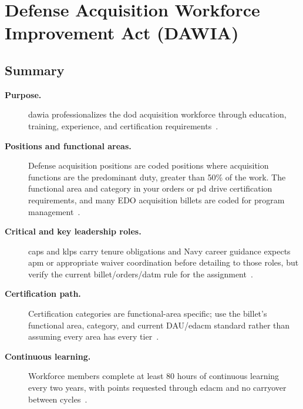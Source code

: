 \documentclass[../main.tex]{subfiles}
\begin{document}
\section{Defense Acquisition Workforce Improvement Act (DAWIA)}

\subsection{Summary}
\begin{description}
  \item[\textbf{Purpose.}] \ac{dawia} professionalizes the \ac{dod} acquisition workforce through education, training, experience, and certification requirements~\autocite{edo-5-2-1-dawia-2025,DoDI-5000-66-DAWIA-2022}.
  \item[\textbf{Positions and functional areas.}] Defense acquisition positions are coded positions where
  acquisition functions are the predominant duty, greater than 50\% of the work. The functional area and
  category in your orders or \ac{pd} drive certification requirements, and many EDO acquisition billets are
  coded for program management~\autocite{edo-5-2-1-dawia-2025,DoDI-5000-66-DAWIA-2022}.
  \item[\textbf{Critical and key leadership roles.}] \acp{cap} and \acp{klp} carry tenure obligations and
  Navy career guidance expects \ac{apm} or appropriate waiver coordination before detailing to those roles, but verify the current billet/orders/\ac{datm} rule for the assignment~\autocite{edo-5-2-1-dawia-2025,DoDI-5000-66-DAWIA-2022}.
  \item[\textbf{Certification path.}] Certification categories are functional-area specific; use the billet's functional area, category, and current DAU/\ac{edacm} standard rather than assuming every area has every tier~\autocite{edo-5-2-1-dawia-2025,DoDI-5000-66-DAWIA-2022}.
  \item[\textbf{Continuous learning.}] Workforce members complete at least 80 hours of continuous learning
  every two years, with points requested through \ac{edacm} and no carryover between cycles~\autocite{edo-5-2-1-dawia-2025,DoDI-5000-66-DAWIA-2022,DAU-Continuous-Learning-2026}.
\end{description}
\end{document}
